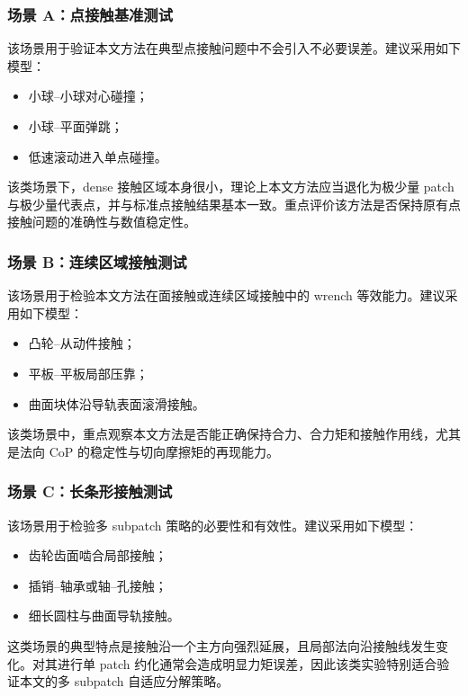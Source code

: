 \documentclass[UTF8,a4paper,11pt]{ctexart}
\begin{document}
\subsubsection{场景 A：点接触基准测试}

该场景用于验证本文方法在典型点接触问题中不会引入不必要误差。建议采用如下模型：
\begin{itemize}[leftmargin=2em]
    \item 小球--小球对心碰撞；
    \item 小球--平面弹跳；
    \item 低速滚动进入单点碰撞。
\end{itemize}

该类场景下，dense 接触区域本身很小，理论上本文方法应当退化为极少量 patch 与极少量代表点，并与标准点接触结果基本一致。重点评价该方法是否保持原有点接触问题的准确性与数值稳定性。

\subsubsection{场景 B：连续区域接触测试}

该场景用于检验本文方法在面接触或连续区域接触中的 wrench 等效能力。建议采用如下模型：
\begin{itemize}[leftmargin=2em]
    \item 凸轮--从动件接触；
    \item 平板--平板局部压靠；
    \item 曲面块体沿导轨表面滚滑接触。
\end{itemize}

该类场景中，重点观察本文方法是否能正确保持合力、合力矩和接触作用线，尤其是法向 CoP 的稳定性与切向摩擦矩的再现能力。

\subsubsection{场景 C：长条形接触测试}

该场景用于检验多 subpatch 策略的必要性和有效性。建议采用如下模型：
\begin{itemize}[leftmargin=2em]
    \item 齿轮齿面啮合局部接触；
    \item 插销--轴承或轴--孔接触；
    \item 细长圆柱与曲面导轨接触。
\end{itemize}

这类场景的典型特点是接触沿一个主方向强烈延展，且局部法向沿接触线发生变化。对其进行单 patch 约化通常会造成明显力矩误差，因此该类实验特别适合验证本文的多 subpatch 自适应分解策略。
\end{document}
